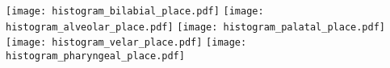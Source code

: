 \documentclass[varwidth=7in]{standalone}
\begin{document}
\texttt{[image: histogram\_bilabial\_place.pdf]}%
\texttt{[image: histogram\_alveolar\_place.pdf]}%
\texttt{[image: histogram\_palatal\_place.pdf]}%
\texttt{[image: histogram\_velar\_place.pdf]}%
\texttt{[image: histogram\_pharyngeal\_place.pdf]}
\end{document}
